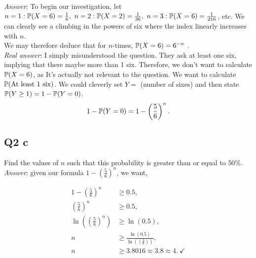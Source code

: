 \documentclass{article}
\begin{document}
            \textit{Answer}: To begin our investigation, let $n = 1 : \mathbb{P}(X = 6) = \frac{1}{6},~ n=2 : \mathbb{P}(X = 2) = \frac{1}{36},~ n=3: \mathbb{P}(X = 6) = \frac{1}{216}$, etc. We can clearly see a climbing in the powers of six where the index linearly increases with $n$.\\ 
            
            We may therefore deduce that for $n$-times, $\mathbb{P}(X=6) = 6^{-n}$ \xmark.\\

            \textit{Real answer}: I simply misunderstood the question. They ask at least one six, implying that there maybe more than 1 six. Therefore, we don't want to calculate $\mathbb{P}(X = 6)$, as It's actually not relevant to the question. We want to calculate $\mathbb{P}(\text{At least 1 six})$. We could cleverly set $Y =$ (number of sixes) and then state $\mathbb{P}(Y \geq 1) = 1 - \mathbb{P}(Y = 0)$.\\

            \[1 - \mathbb{P}(Y = 0) = 1 - \left( \frac{5}{6} \right)^n.\]

        \subsection{Q2 c}
            Find the values of $n$ such that this probability is greater than or equal to $50\%$.\\

            \textit{Answer}: given our formula $1 - \left( \frac{5}{6} \right)^n$, we want,

            \begin{align*}
                1 - \left( \frac{5}{6} \right)^n &\geq 0.5,\\
                \left( \frac{5}{6} \right)^n&\geq 0.5,\\
                \ln\left( \left( \frac{5}{6} \right)^n \right)&\geq \ln(0.5),\\
                n&\geq\frac{\ln(0.5)}{\ln\left( \left( \frac{5}{6} \right)\right)},\\
                n&\geq3.8016 \approx 3.8 \approx 4. ~\checkmark
            \end{align*}

            
\end{document}

